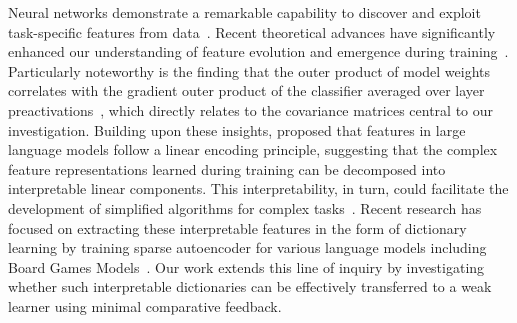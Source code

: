 Neural networks demonstrate a remarkable capability to discover and exploit task-specific features from data~\citep{yang_feature, bordelon2022self,shi2022theoretical}. Recent theoretical advances have significantly enhanced our understanding of feature evolution and emergence during training~\citep{abbe2022merged,ba2022high,damian2022neural,yang2021tensor,zhu2022quadratic}. Particularly noteworthy is the finding that the outer product of model weights correlates with the gradient outer product of the classifier averaged over layer preactivations~\citep{rfm}, which directly relates to the covariance matrices central to our investigation. Building upon these insights, \citet{elhage2022superposition} proposed that features in large language models follow a linear encoding principle, suggesting that the complex feature representations learned during training can be decomposed into interpretable linear components. This interpretability, in turn, could facilitate the development of simplified algorithms for complex tasks~\citep{Fawzi2022,Romera-Paredes2024}. Recent research has focused on extracting these interpretable features in the form of dictionary learning by training sparse autoencoder for various language models including Board Games Models~\citep{marks2024sparsefeaturecircuitsdiscovering, bricken2023monosemanticity,karvonen2024measuring}. Our work extends this line of inquiry by investigating whether such interpretable dictionaries can be effectively transferred to a weak learner using minimal comparative feedback.

